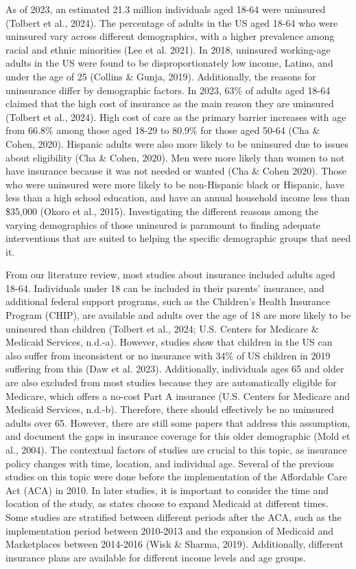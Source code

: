 \documentclass[12pt]{article}
\begin{document}
As of 2023, an estimated 21.3 million individuals aged 18-64 were uninsured (Tolbert et al., 2024). The percentage of adults in the US aged 18-64 who were uninsured vary across different demographics, with a higher prevalence among racial and ethnic minorities (Lee et al. 2021). In 2018, uninsured working-age adults in the US were found to be disproportionately low income, Latino, and under the age of 25 (Collins \& Gunja, 2019). Additionally, the reasons for uninsurance differ by demographic factors. In 2023, 63\% of adults aged 18-64 claimed that the high cost of insurance as the main reason they are uninsured (Tolbert et al., 2024). High cost of care as the primary barrier increases with age from 66.8\% among those aged 18-29 to 80.9\% for those aged 50-64 (Cha \& Cohen, 2020). Hispanic adults were also more likely to be uninsured due to issues about eligibility (Cha \& Cohen, 2020). Men were more likely than women to not have insurance because it was not needed or wanted (Cha \& Cohen 2020). Those who were uninsured were more likely to be non-Hispanic black or Hispanic, have less than a high school education, and have an annual household income less than \$35,000 (Okoro et al., 2015). Investigating the different reasons among the varying demographics of those uninsured is paramount to finding adequate interventions that are suited to helping the specific demographic groups that need it.

From our literature review, most studies about insurance included adults aged 18-64. Individuals under 18 can be included in their parents’ insurance, and additional federal support programs, such as the Children’s Health Insurance Program (CHIP), are available and adults over the age of 18 are more likely to be uninsured than children (Tolbert et al., 2024; U.S. Centers for Medicare \& Medicaid Services, n.d.-a). However, studies show that children in the US can also suffer from inconsistent or no insurance with 34\% of US children in 2019 suffering from this (Daw et al. 2023). Additionally, individuals ages 65 and older are also excluded from most studies because they are automatically eligible for Medicare, which offers a no-cost Part A insurance (U.S. Centers for Medicare and Medicaid Services, n.d.-b). Therefore, there should effectively be no uninsured adults over 65. However, there are still some papers that address this assumption, and document the gaps in insurance coverage for this older demographic (Mold et al., 2004). The contextual factors of studies are crucial to this topic, as insurance policy changes with time, location, and individual age. Several of the previous studies on this topic were done before the implementation of the Affordable Care Act (ACA) in 2010. In later studies, it is important to consider the time and location of the study, as states choose to expand Medicaid at different times. Some studies are stratified between different periods after the ACA, such as the implementation period between 2010-2013 and the expansion of Medicaid and Marketplaces between 2014-2016 (Wisk \& Sharma, 2019). Additionally, different insurance plans are available for different income levels and age groups.
\end{document}
